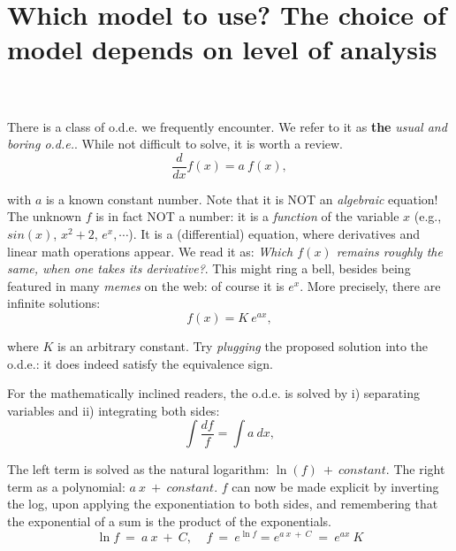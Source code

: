 \section{Which model to use? The choice of model depends on level of analysis}

\newpage
\begin{svgraybox}
	\\
	\\
	There is a class of o.d.e. we frequently encounter.  We refer to it as {\bf{the}} \textit{usual and boring o.d.e.}. While not difficult to solve, it is worth a review. 
	\begin{equation}
		\frac{d}{dx}f(x) = a\ f(x), 
	\end{equation}

	with $a$ is a known constant number.
	Note that it is NOT an \textit{algebraic} equation! The unknown $f$ is in fact NOT a number: it is a \textit{function} of the variable $x$ (e.g., $sin(x)$, $x^2+2$, $e^x, \cdots$).
	It is a (differential) equation, where derivatives and linear math operations appear. We read it as: \textit{Which $f(x)$ remains roughly the same, when one takes its derivative?}.  
	This might ring a bell, besides being featured in many \textit{memes} on the web: of course it is $e^{x}$. 
	More precisely, there are infinite solutions:
	\begin{equation}
		f(x) = K\ e^{a x}, 
	\end{equation}

	where $K$ is an arbitrary constant.	
	Try \textit{plugging} the proposed solution into the o.d.e.: it does indeed satisfy the equivalence sign.
	
	For the mathematically inclined readers, the o.d.e. is solved by i) separating variables and ii) integrating both sides:
	\begin{equation}
		\int \frac{df}{f} = \int a\ dx, 
	\end{equation}

	The left term is solved as the natural logarithm: $\ln(f)\ +\ constant$. The right term as a polynomial: $a\ x\ +\ constant$. $f$ can now be made explicit by inverting the log, upon applying the exponentiation to both sides, and remembering that the exponential of a sum is the product of the exponentials.
	\begin{equation}
		\ln{f}\ =\ a\ x\ +\ C,\ \ \ \ \ f\ =\ e^{\ln{f}} = e^{a\ x\ +\ C}\ =\ e^{a x}\ K 
	\end{equation}


\end{svgraybox}
